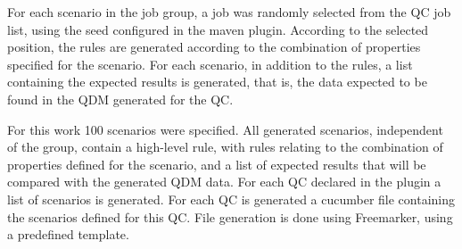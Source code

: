 
For each scenario in the job group, a job was randomly selected from the QC job list, using the seed configured in the maven plugin. According to the selected position, the rules are generated according to the combination of properties specified for the scenario. For each scenario, in addition to the rules, a list containing the expected results is generated, that is, the data expected to be found in the QDM generated for the QC.


For this work 100 scenarios were specified. All generated scenarios, independent of the group, contain a high-level rule, with rules relating to the combination of properties defined for the scenario, and a list of expected results that will be compared with the generated QDM data. For each QC declared in the plugin a list of scenarios is generated. For each QC is generated a cucumber file containing the scenarios defined for this QC. File generation is done using Freemarker, using a predefined template.


